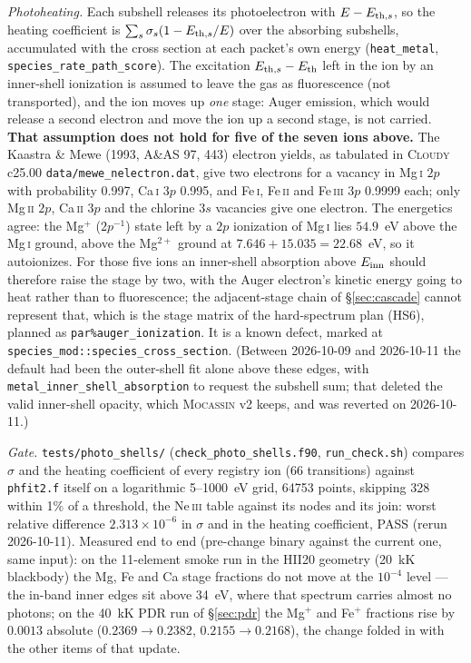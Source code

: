 \documentclass[english,a4paper]{my_memo}
\newcommand{\code}[1]{\texttt{#1}}
\begin{document}
\emph{Photoheating.}  Each subshell releases its photoelectron with
$E - E_{{\rm th},s}$, so the heating coefficient is
$\sum_s \sigma_s (1 - E_{{\rm th},s}/E)$ over the absorbing subshells,
accumulated with the cross section at each packet's own energy
(\code{heat\_metal}, \code{species\_rate\_path\_score}).  The excitation
$E_{{\rm th},s} - E_{\rm th}$ left in the ion by an inner-shell ionization
is assumed to leave the gas as fluorescence (not transported), and the ion
moves up \emph{one} stage: Auger emission, which would release a second
electron and move the ion up a second stage, is not carried.  \textbf{That
assumption does not hold for five of the seven ions above.}  The
Kaastra \& Mewe (1993, A\&AS 97, 443) electron yields, as tabulated in
\textsc{Cloudy} c25.00 \code{data/mewe\_nelectron.dat}, give two electrons
for a vacancy in Mg\,\textsc{i} $2p$ with probability 0.997, Ca\,\textsc{i}
$3p$ 0.995, and Fe\,\textsc{i}, Fe\,\textsc{ii} and Fe\,\textsc{iii} $3p$
0.9999 each; only Mg\,\textsc{ii} $2p$, Ca\,\textsc{ii} $3p$ and the
chlorine $3s$ vacancies give one electron.  The energetics agree: the
Mg$^+$ ($2p^{-1}$) state left by a $2p$ ionization of Mg\,\textsc{i} lies
$54.9$~eV above the Mg\,\textsc{i} ground, above the Mg$^{2+}$ ground at
$7.646 + 15.035 = 22.68$~eV, so it autoionizes.  For those five ions an
inner-shell absorption above $E_{\rm inn}$ should therefore raise the
stage by two, with the Auger electron's kinetic energy going to heat
rather than to fluorescence; the adjacent-stage chain of
\S\ref{sec:cascade} cannot represent that, which is the stage matrix of the
hard-spectrum plan (HS6), planned as \code{par\%auger\_ionization}.  It is
a known defect, marked at \code{species\_mod::species\_cross\_section}.
(Between 2026-10-09 and 2026-10-11 the default had been the outer-shell fit
alone above these edges, with \code{metal\_inner\_shell\_absorption} to
request the subshell sum; that deleted the valid inner-shell opacity, which
\textsc{Mocassin} v2 keeps, and was reverted on 2026-10-11.)

\emph{Gate.}  \code{tests/photo\_shells/} (\code{check\_photo\_shells.f90},
\code{run\_check.sh}) compares $\sigma$ and the heating coefficient of every
registry ion (66 transitions) against \code{phfit2.f} itself on a
logarithmic 5--1000~eV grid, 64753 points, skipping 328 within 1\% of a
threshold, the Ne\,\textsc{iii} table against its nodes and its join:
worst relative difference $2.313{\times}10^{-6}$ in $\sigma$ and in the
heating coefficient, PASS (rerun 2026-10-11).  Measured end to end (pre-change binary against the current one, same
input): on the 11-element smoke run in the HII20 geometry (20~kK
blackbody) the Mg, Fe and Ca stage fractions do not move at the $10^{-4}$
level --- the in-band inner edges sit above 34~eV, where that spectrum
carries almost no photons; on the 40~kK PDR run of \S\ref{sec:pdr} the
Mg$^{+}$ and Fe$^{+}$ fractions rise by $0.0013$ absolute
($0.2369\to0.2382$, $0.2155\to0.2168$), the change folded in with the
other items of that update.
\end{document}
